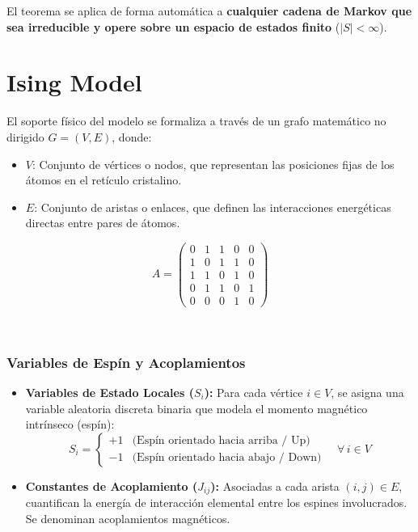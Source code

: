\begin{observacion}
    El teorema se aplica de forma automática a \textbf{cualquier cadena de Markov que sea irreducible y opere sobre un espacio de estados finito} ($|S| < \infty$).
\end{observacion}

\section{Ising Model}

\begin{minipage}{0.45\textwidth}
    \noindent
    El soporte físico del modelo se formaliza a través de un grafo matemático no dirigido $G = (V, E)$, donde:
    \begin{itemize}
        \item $V$: Conjunto de vértices o nodos, que representan las posiciones fijas de los átomos en el retículo cristalino.
        \item $E$: Conjunto de aristas o enlaces, que definen las interacciones energéticas directas entre pares de átomos.
    \end{itemize}
\end{minipage}
\hfill
\begin{minipage}{0.5\textwidth}
    \[
    A = \begin{pmatrix}
    0 & 1 & 1 & 0 & 0 \\
    1 & 0 & 1 & 1 & 0 \\
    1 & 1 & 0 & 1 & 0 \\
    0 & 1 & 1 & 0 & 1 \\
    0 & 0 & 0 & 1 & 0
    \end{pmatrix}
    \]
    \begin{center}
        \addtolength{\baselineskip}{-0.2cm}
         \\
    \end{center}
\end{minipage}

\vspace{0.5cm}

\noindent 
\subsubsection{Variables de Espín y Acoplamientos}
\begin{itemize}
    \item \textbf{Variables de Estado Locales ($S_i$):} Para cada vértice $i \in V$, se asigna una variable aleatoria discreta binaria que modela el momento magnético intrínseco (espín):
    \[
    S_i = \begin{cases} +1 & \text{(Espín orientado hacia arriba / Up)} \\ -1 & \text{(Espín orientado hacia abajo / Down)} \end{cases} \quad \forall \, i \in V
    \]
    \item \textbf{Constantes de Acoplamiento ($J_{ij}$):} Asociadas a cada arista $(i,j) \in E$, cuantifican la energía de interacción elemental entre los espines involucrados. Se denominan acoplamientos magnéticos.
\end{itemize}


